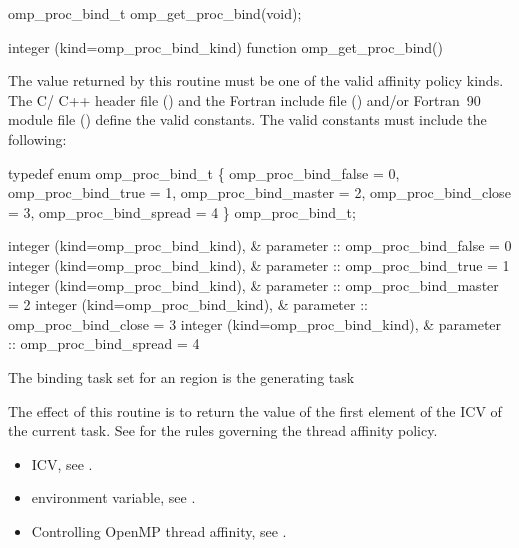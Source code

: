 \format
\ccppspecificstart
\begin{boxedcode}
omp\_proc\_bind\_t omp\_get\_proc\_bind(void);
\end{boxedcode}
\ccppspecificend

\fortranspecificstart
\begin{boxedcode}
integer (kind=omp\_proc\_bind\_kind) function omp\_get\_proc\_bind()
\end{boxedcode}
\fortranspecificend

\constraints
The value returned by this routine must be one of the valid affinity policy kinds. The C/
C++ header file () and the Fortran include file () and/or Fortran~90 
module file () define the valid constants. The valid constants must include the 
following:

\ccppspecificstart
\begin{codepar}
typedef enum omp\_proc\_bind\_t \{
  omp\_proc\_bind\_false = 0,
  omp\_proc\_bind\_true = 1,
  omp\_proc\_bind\_master = 2,
  omp\_proc\_bind\_close = 3,
  omp\_proc\_bind\_spread = 4
\} omp\_proc\_bind\_t;
\end{codepar}
\ccppspecificend

\fortranspecificstart
\begin{codepar}
integer (kind=omp\_proc\_bind\_kind), &
                parameter :: omp\_proc\_bind\_false = 0
integer (kind=omp\_proc\_bind\_kind), &
                parameter :: omp\_proc\_bind\_true = 1
integer (kind=omp\_proc\_bind\_kind), &
                parameter :: omp\_proc\_bind\_master = 2
integer (kind=omp\_proc\_bind\_kind), &
                parameter :: omp\_proc\_bind\_close = 3
integer (kind=omp\_proc\_bind\_kind), &
                parameter :: omp\_proc\_bind\_spread = 4
\end{codepar}
\fortranspecificend

\binding
The binding task set for an  region is the generating task

\effect
The effect of this routine is to return the value of the first element of the  ICV 
of the current task. See  
for the rules governing the thread affinity policy.

\crossreferences
\begin{itemize}
\item {} ICV, see 
.

\item {} environment variable, see 
.

\item Controlling OpenMP thread affinity, see 
. 
\end{itemize}



